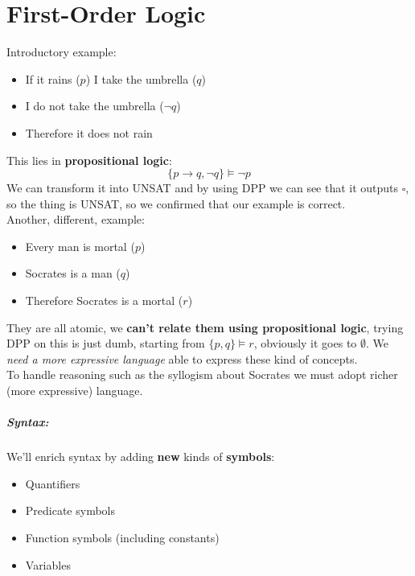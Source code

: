 \chapter{First-Order Logic}

Introductory example: 
\begin{itemize}
	\item If it rains ($p$) I take the umbrella ($q$) 
	\item I do not take the umbrella  ($\neg q$)
	\\ \bline
	\item Therefore it does not rain
\end{itemize}

This lies in \textbf{propositional logic}:
$$ \{p \rightarrow q, \neg q\} \models \neg p $$
We can transform it into UNSAT and by using DPP we can see that it outputs $\square$, so the thing is UNSAT, so we confirmed that our example is correct.\\

Another, different, example:
\begin{itemize}
	\item Every man is mortal ($p$)
	\item Socrates is a man ($q$)
	\\ \bline
	\item Therefore Socrates is a mortal ($r$)
\end{itemize}
They are all atomic, we \textbf{can't relate them using propositional logic}, trying DPP on this is just dumb, starting from $\{p,q\} \models r$, obviously it goes to $\emptyset$. We \textit{need a more expressive language} able to express these kind of concepts.\\
To handle reasoning such as the syllogism about Socrates we must adopt richer (more expressive) language.\\

\paragraph{Syntax:} We'll enrich syntax by adding \textbf{new} kinds of \textbf{symbols}: 
\begin{itemize}
	\item Quantifiers
	\item Predicate symbols
	\item Function symbols (including constants)
	\item Variables
\end{itemize}

